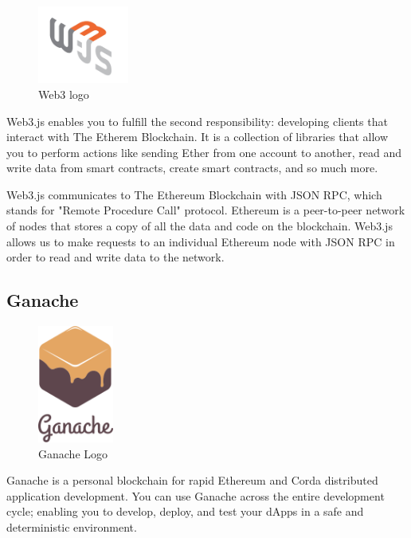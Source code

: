 \begin{figure}
	\vspace{-10pt}
	\includegraphics[width=3cm]{images/chapter3/web3.jpeg}
	\vspace{-10pt}
	\caption{{\footnotesize Web3 logo}}
\end{figure}

Web3.js enables you to fulfill the second responsibility: developing clients that interact with The Etherem Blockchain. It is a collection of libraries that allow you to perform actions like sending Ether from one account to another, read and write data from smart contracts, create smart contracts, and so much more.

Web3.js communicates to The Ethereum Blockchain with JSON RPC, which stands for "Remote Procedure Call" protocol. Ethereum is a peer-to-peer network of nodes that stores a copy of all the data and code on the blockchain. Web3.js allows us to make requests to an individual Ethereum node with JSON RPC in order to read and write data to the network\cite{mccubbinIntroWeb3Js}.

\subsection{Ganache}

\begin{figure}
	\vspace{-10pt}
	\includegraphics[width=2.5cm]{images/chapter3/ganache-logo-dark.png}
	\vspace{-10pt}
	\caption{{\footnotesize Ganache Logo}}
\end{figure}

Ganache is a personal blockchain for rapid Ethereum and Corda distributed application development. You can use Ganache across the entire development cycle; enabling you to develop, deploy, and test your dApps in a safe and deterministic environment.

